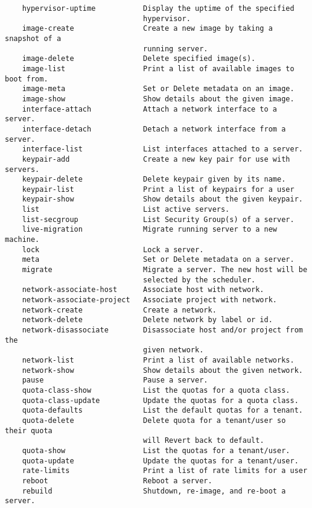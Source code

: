 \documentclass[a4paper,left=1.5cm,right=1.5cm,11pt]{article}
\begin{document}
\begin{lstlisting}
    hypervisor-uptime           Display the uptime of the specified
                                hypervisor.
    image-create                Create a new image by taking a snapshot of a
                                running server.
    image-delete                Delete specified image(s).
    image-list                  Print a list of available images to boot from.
    image-meta                  Set or Delete metadata on an image.
    image-show                  Show details about the given image.
    interface-attach            Attach a network interface to a server.
    interface-detach            Detach a network interface from a server.
    interface-list              List interfaces attached to a server.
    keypair-add                 Create a new key pair for use with servers.
    keypair-delete              Delete keypair given by its name.
    keypair-list                Print a list of keypairs for a user
    keypair-show                Show details about the given keypair.
    list                        List active servers.
    list-secgroup               List Security Group(s) of a server.
    live-migration              Migrate running server to a new machine.
    lock                        Lock a server.
    meta                        Set or Delete metadata on a server.
    migrate                     Migrate a server. The new host will be
                                selected by the scheduler.
    network-associate-host      Associate host with network.
    network-associate-project   Associate project with network.
    network-create              Create a network.
    network-delete              Delete network by label or id.
    network-disassociate        Disassociate host and/or project from the
                                given network.
    network-list                Print a list of available networks.
    network-show                Show details about the given network.
    pause                       Pause a server.
    quota-class-show            List the quotas for a quota class.
    quota-class-update          Update the quotas for a quota class.
    quota-defaults              List the default quotas for a tenant.
    quota-delete                Delete quota for a tenant/user so their quota
                                will Revert back to default.
    quota-show                  List the quotas for a tenant/user.
    quota-update                Update the quotas for a tenant/user.
    rate-limits                 Print a list of rate limits for a user
    reboot                      Reboot a server.
    rebuild                     Shutdown, re-image, and re-boot a server.

\end{lstlisting}
\end{document}
